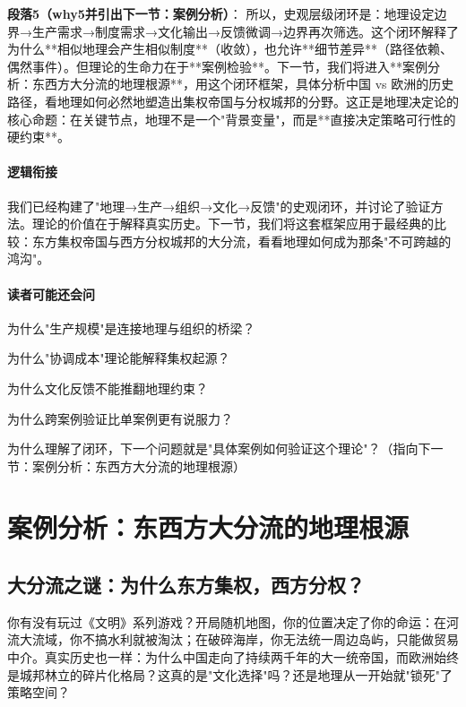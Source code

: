 \documentclass[openany, a4paper, 12pt]{book}
\newenvironment{motivation}{
	\vspace{0.5em}
	\begin{tcolorbox}[
		colback=gray!10,           %
		colframe=gray!60,          %
		title=\textit{本章动机 (Motivation)},
		fonttitle=\bfseries,
		arc=0mm,                   %
		leftrule=3mm               %
		]
		\small \itshape %
	}{
	\end{tcolorbox}
	\vspace{1em}
}
\begin{document}
	\textbf{段落5（why5并引出下一节：案例分析）}：  
	所以，史观层级闭环是：地理设定边界→生产需求→制度需求→文化输出→反馈微调→边界再次筛选。这个闭环解释了为什么**相似地理会产生相似制度**（收敛），也允许**细节差异**（路径依赖、偶然事件）。但理论的生命力在于**案例检验**。下一节，我们将进入**案例分析：东西方大分流的地理根源**，用这个闭环框架，具体分析中国 vs 欧洲的历史路径，看地理如何必然地塑造出集权帝国与分权城邦的分野。这正是地理决定论的核心命题：在关键节点，地理不是一个"背景变量"，而是**直接决定策略可行性的硬约束**。
	
	\paragraph*{逻辑衔接}
	我们已经构建了"地理→生产→组织→文化→反馈"的史观闭环，并讨论了验证方法。理论的价值在于解释真实历史。下一节，我们将这套框架应用于最经典的比较：东方集权帝国与西方分权城邦的大分流，看看地理如何成为那条"不可跨越的鸿沟"。
	
	\paragraph*{读者可能还会问}
	\item 为什么"生产规模"是连接地理与组织的桥梁？
	\item 为什么"协调成本"理论能解释集权起源？
	\item 为什么文化反馈不能推翻地理约束？
	\item 为什么跨案例验证比单案例更有说服力？
	\item 为什么理解了闭环，下一个问题就是"具体案例如何验证这个理论"？（指向下一节：案例分析：东西方大分流的地理根源）
	
	\section{案例分析：东西方大分流的地理根源}
	
	\subsection{大分流之谜：为什么东方集权，西方分权？}
	
	\begin{motivation}
		你有没有玩过《文明》系列游戏？开局随机地图，你的位置决定了你的命运：在河流大流域，你不搞水利就被淘汰；在破碎海岸，你无法统一周边岛屿，只能做贸易中介。真实历史也一样：为什么中国走向了持续两千年的大一统帝国，而欧洲始终是城邦林立的碎片化格局？这真的是"文化选择"吗？还是地理从一开始就"锁死"了策略空间？
	\end{motivation}
	
\end{document}
